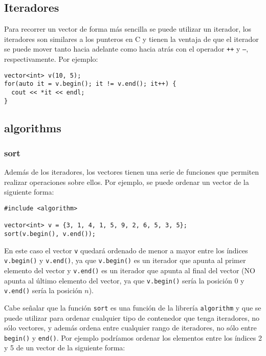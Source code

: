 \subsection{Iteradores}

Para recorrer un vector de forma más sencilla se puede utilizar un iterador, los iteradores son similares a los punteros
en C y tienen la ventaja de que el iterador se puede mover tanto hacia adelante como hacia atrás con el operador
\texttt{++} y \texttt{--}, respectivamente. Por ejemplo:

\begin{lstlisting}
vector<int> v(10, 5);
for(auto it = v.begin(); it != v.end(); it++) {
  cout << *it << endl;
}
\end{lstlisting}

\subsection{algorithms}

\subsubsection{sort}

Además de los iteradores, los vectores tienen una serie de funciones que permiten realizar operaciones sobre ellos. Por
ejemplo, se puede ordenar un vector de la siguiente forma:

\begin{lstlisting}
#include <algorithm>

vector<int> v = {3, 1, 4, 1, 5, 9, 2, 6, 5, 3, 5};
sort(v.begin(), v.end());
\end{lstlisting}

En este caso el vector \texttt{v} quedará ordenado de menor a mayor entre los índices \texttt{v.begin()} y
\texttt{v.end()}, ya que \texttt{v.begin()} es un iterador que apunta al primer elemento del vector y \texttt{v.end()}
es un iterador que apunta al final del vector (NO apunta al último elemento del vector, ya que \texttt{v.begin()} sería
la posición $0$ y \texttt{v.end()} sería la posición $n$).

Cabe señalar que la función \texttt{sort} es una función de la librería \texttt{algorithm} y que se puede utilizar para
ordenar cualquier tipo de contenedor que tenga iteradores, no sólo vectores, y además ordena entre cualquier rango de
iteradores, no sólo entre \texttt{begin()} y \texttt{end()}. Por ejemplo podríamos ordenar los elementos entre los
índices 2 y 5 de un vector de la siguiente forma:

